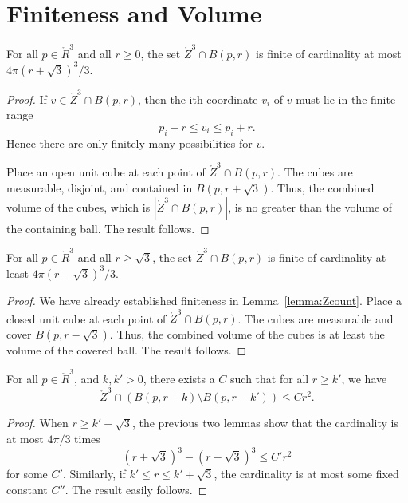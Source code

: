 \section{Finiteness and Volume}

\begin{lemma}
    For all $p\in\ring{R}^3$ and all $r\ge 0$, the set
    $\ring{Z}^3\cap B(p,r)$ is finite of cardinality at most
    $4\pi (r+\sqrt3)^3/3$.
\end{lemma}

\begin{proof}  If $v\in\ring{Z}^3\cap B(p,r)$, then the ith
coordinate $v_i$ of $v$ must lie in the finite range
    $$
    p_i - r \le v_i \le p_i + r.
    $$
Hence there are only finitely many possibilities for $v$.


Place an open unit cube at each point of $\ring{Z}^3\cap B(p,r)$.
The cubes are measurable, disjoint, and contained in
$B(p,r+\sqrt3)$.  Thus, the combined volume of the cubes, which is
$|\ring{Z}^3\cap B(p,r)|$,  is no greater than the volume of the
containing ball.  The result follows.
\end{proof}

\begin{lemma}
  For all $p\in\ring{R}^3$ and all $r\ge\sqrt3$, the set
    $\ring{Z}^3\cap B(p,r)$ is finite of cardinality at least
    $4\pi (r-\sqrt3)^3/3$.
\end{lemma}

\begin{proof} We have already established finiteness in
Lemma~\ref{lemma:Zcount}.  Place a closed unit cube at each point
of $\ring{Z}^3\cap B(p,r)$.  The cubes are measurable and cover
$B(p,r-\sqrt3)$.  Thus, the combined volume of the cubes is at
least the volume of the covered ball.  The result follows.
\end{proof}

\begin{lemma}
For all $p\in\ring{R}^3$, and $k,k'>0$, there exists a $C$ such
that for all $r\ge k'$, we have
    $$
    \ring{Z}^3 \cap (B(p,r+k) \setminus B(p,r-k')) \le C r^2.
    $$
\end{lemma}

\begin{proof}  When $r \ge k'+\sqrt3$, the previous two lemmas show
that the cardinality is at most $4\pi/3$ times
    $$(r + \sqrt3)^3 - (r - \sqrt3)^3 \le C' r^2$$
for some $C'$.  Similarly, if $k'\le r\le k'+\sqrt3$, the
cardinality is at most some fixed constant $C''$.  The result
easily follows.
\end{proof}

